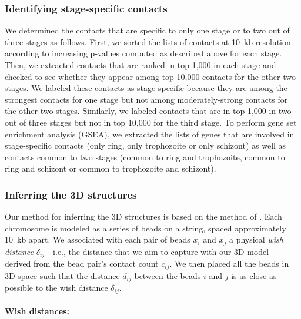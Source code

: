 \subsubsection{Identifying stage-specific contacts}
\label{met:spageSpecific}
We determined the contacts that are specific to only one stage or to two out of three stages
as follows. First, we sorted the lists of contacts at 10~kb resolution according to increasing
p-values computed as described above for each stage. Then, we extracted contacts that are
ranked in top 1,000 in each stage and checked to see whether they appear among top 10,000
contacts for the other two stages. We labeled these contacts as stage-specific because they
are among the strongest contacts for one stage but not among moderately-strong contacts for
the other two stages. Similarly, we labeled contacts that are in top 1,000 in two out of
three stages but not in top 10,000 for the third stage. To perform gene set enrichment
analysis (GSEA), we extracted the lists of genes that are involved in stage-specific contacts
(only ring, only trophozoite or only schizont) as well as contacts common to two stages
(common to ring and trophozoite, common to ring and schizont or common to trophozoite and schizont).


\subsubsection{Inferring the 3D structures}
\label{met:inferring}
Our method for inferring the 3D structures is based on the method of \cite{duan:three}.
Each chromosome is modeled as a series of beads on a string, spaced approximately
10~kb apart. We associated with each pair of beads $x_i$ and $x_j$ a physical
{\em wish distance} $\delta_{ij}$---i.e., the distance that we aim to capture with
our 3D model---derived from the bead pair's contact count $c_{ij}$. We then
placed all the beads in 3D space such that the distance $d_{ij}$ between the beads
$i$ and $j$ is as close as possible to the wish distance $\delta_{ij}$.

\paragraph{Wish distances: }

